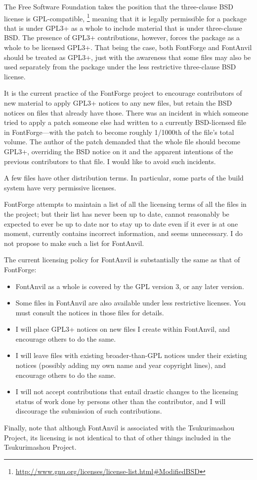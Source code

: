 \documentclass[11pt]{report}
\begin{document}
The Free Software Foundation takes the position that the three-clause BSD
license is GPL-compatible,%
\footnote{\url{http://www.gnu.org/licenses/license-list.html\#ModifiedBSD}}
meaning that it is legally permissible for a package that is under GPL3+ as
a whole to include material that is under three-clause BSD.  The presence of
GPL3+ contributions, however, forces the package as a whole to be licensed
GPL3+.  That being the case, both FontForge and FontAnvil should be treated
as GPL3+, just with the awareness that some files may also be used
separately from the package under the less restrictive three-clause BSD
license.

It is the current practice of the FontForge project to encourage
contributors of new material to apply GPL3+ notices to any new files, but
retain the BSD notices on files that already have those.  There was an
incident in which someone tried to apply a patch someone else had written to
a currently BSD-licensed file in FontForge---with the patch to become
roughly 1/1000th of the file's total volume.  The author of the patch
demanded that the whole file should become GPL3+, overriding the BSD notice
on it and the apparent intentions of the previous contributors to that file. 
I would like to avoid such incidents.

A few files have other distribution terms.  In particular, some parts of the
build system have very permissive licenses.

FontForge attempts to maintain a list of all the licensing terms of all the
files in the project; but their list has never been up to date, cannot
reasonably be expected to ever be up to date nor to stay up to date even if
it ever is at one moment, currently contains incorrect information, and
seems unnecessary.  I do not propose to make such a list for FontAnvil.

The current licensing policy for FontAnvil is substantially the same as that
of FontForge:
\begin{itemize}
\item FontAnvil as a whole is covered by the GPL version 3, or any later
version.
\item Some files in FontAnvil are also available under less restrictive
licenses.  You must consult the notices in those files for details.
\item I will place GPL3+ notices on new files I create within FontAnvil,
and encourage others to do the same.
\item I will leave files with existing broader-than-GPL notices under their
existing notices (possibly adding my own name and year copyright lines), and
encourage others to do the same.
\item I will not accept contributions that entail drastic changes to the
licensing status of work done by persons other than the contributor, and I
will discourage the submission of such contributions.
\end{itemize}

Finally, note that although FontAnvil is associated with the Tsukurimashou
Project, its licensing is not identical to that of other things included in
the Tsukurimashou Project.
\clearpage

\end{document}
